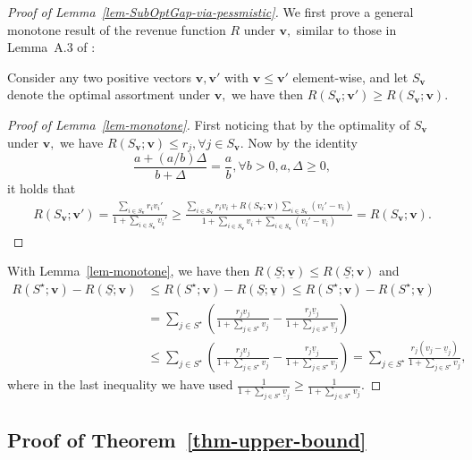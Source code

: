 \documentclass[10pt, letterpaper]{article}
\begin{document}
\begin{proof}[Proof of Lemma~\ref{lem-SubOptGap-via-pessmistic}]
    We first prove a general monotone result of the revenue function $R$ under $\bm v,$ similar to those in Lemma~A.3 of \citet{agrawal2019mnl}:
    \begin{lemma}\label{lem-monotone}
    Consider any two positive vectors $\bm v, \bm v'$ with $\bm v \leq \bm v'$ element-wise, and let $S_{\bm v}$ denote the optimal assortment under $\bm v,$ we have then $R(S_{\bm v};\bm v')\geq R(S_{\bm v};\bm v).$    
    \end{lemma}
    \begin{proof}[Proof of Lemma~\ref{lem-monotone}]
    First noticing that by the optimality of $S_{\bm v}$ under $\bm v,$ we have $ R(S_{\bm v};\bm v) \leq r_j, \forall j \in S_{\bm v}.$ Now by the identity $$ \frac{a+(a/b)\Delta}{b+\Delta} = \frac{a}{b}, \forall b>0,a,\Delta\geq 0,$$ it holds that \begin{align*}
    R(S_{\bm v};\bm v') = \frac{\sum_{i\in S_{\bm v}}r_iv_i'}{1+\sum_{i\in S_{\bm v}}v_i' } \geq \frac{\sum_{i\in S_{\bm v}} r_iv_i +R(S_{\bm v};\bm v)\sum_{i\in S_{\bm v}}(v_i' - v_i)}{1+\sum_{i\in S_{\bm v}}v_i + \sum_{i\in S_{\bm v}} (v_i'-v_i) }= R(S_{\bm v};\bm v).
\end{align*}
    \end{proof}
With Lemma~\ref{lem-monotone}, we have then $R(\underline{S};\underline{\bm v}) \leq R(\underline{S};\bm v)$ and \begin{align*}
    R(S^\star;\bm v) -   R(\underline{S};{\bm v})&\leq  R(S^\star;\bm v) -   R(\underline{S};\underline{\bm v})\leq R(S^\star;\bm v) - R(S^\star;\underline{\bm v})\\
    &= \sum_{j\in S^\star}(\frac{r_jv_j}{1+\sum_{j\in S^\star} v_j} - \frac{r_j\underline{v}_j}{1+\sum_{j\in S^\star} \underline{v}_j})\\
    &\leq \sum_{j\in S^\star}(\frac{r_jv_j}{1+\sum_{j\in S^\star} v_j} - \frac{r_j\underline{v}_j}{1+\sum_{j\in S^\star} {v}_j})= \sum_{j\in S^\star}\frac{r_j(v_j - \underline{v}_j)}{1+\sum_{j\in S^\star} v_j},
\end{align*}
where in the last inequality we have used $
    \frac{1}{1+\sum_{j\in S^\star}\underline{v}_j} \geq \frac{1}{1+\sum_{j\in S^\star} v_j}.$
    
\end{proof}

\subsection{Proof of Theorem~\ref{thm-upper-bound}}\label{subsec: proof upper bound} 
\end{document}
